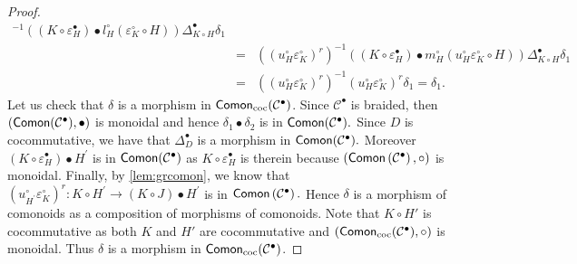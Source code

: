 \documentclass[nosumlimits,twoside]{amsart}
\theoremstyle{definition}
\theoremstyle{remark}
\newcommand{\Cc}{\mathcal{C}}
\def\Comon{{\sf Comon}}
\def\cComon{{\sf Comon}_{\mathrm{coc}}}
\begin{document}
\begin{proof}
\begin{eqnarray*}
^{-1}\left( \left( K\circ \varepsilon _{H}^{\bullet }\right) \bullet
l_{H}^{\circ }\left( \varepsilon _{K}^{\circ }\circ H\right) \right) \Delta
_{K\circ H}^{\bullet }\delta _{1} \\
&=&\left( \left( u_{H}^{\circ }\varepsilon _{K}^{\circ }\right) ^{r}\right)
^{-1}\left( \left( K\circ \varepsilon _{H}^{\bullet }\right) \bullet
m_{H}^{\circ }\left( u_{H}^{\circ }\varepsilon _{K}^{\circ }\circ H\right)
\right) \Delta _{K\circ H}^{\bullet }\delta _{1} \\
&=&\left( \left( u_{H}^{\circ }\varepsilon _{K}^{\circ }\right) ^{r}\right)
^{-1}\left( u_{H}^{\circ }\varepsilon _{K}^{\circ }\right) ^{r}\delta
_{1}=\delta _{1}.
\end{eqnarray*}%
Let us check that $\delta $ is a morphism in $\cComon(\Cc^\bullet)$. Since $\Cc^{\bullet }$
is braided, then $\left( \Comon(\Cc^\bullet) ,\bullet
\right) $ is monoidal and hence $\delta _{1}\bullet \delta _{2}$ is in $\Comon(\Cc^\bullet).$ Since $D$ is
cocommutative, we have that $\Delta _{D}^{\bullet }$ is a morphism in $\Comon(\Cc^\bullet).$ Moreover $\left( K\circ
\varepsilon _{H}^{\bullet }\right) \bullet H^{\prime }$ is in $\Comon(\Cc^\bullet)$ as $K\circ \varepsilon _{H}^{\bullet }$ is therein because $\left(
\Comon\left( \Cc^{\bullet }\right) ,\circ \right) $ is monoidal. Finally, by \cref{lem:grcomon}, we know
that  $\left( u_{H^{\prime }}^{\circ }\varepsilon _{K}^{\circ }\right)
^{r}:K\circ H^{\prime }\rightarrow \left( K\circ J\right) \bullet H^{\prime }
$ is in $\Comon\left( \mathcal{C}^{\bullet }\right) .$ Hence $\delta $ is a
morphism of comonoids as a composition of morphisms of comonoids. Note that $K\circ H'$ is cocommutative as both $K$ and $H'$ are cocommutative and $(\cComon(\Cc^\bullet),\circ)$ is monoidal.
Thus $\delta$ is a morphism in $\cComon(\Cc^\bullet)$.


\end{proof}
\end{document}

